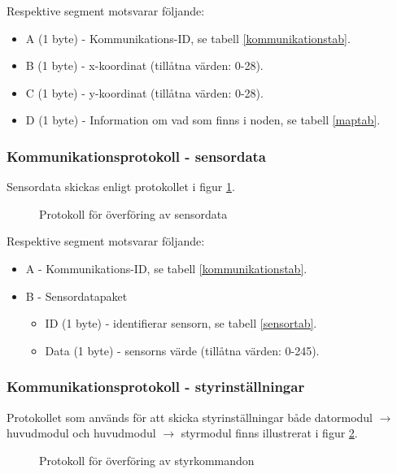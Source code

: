 \documentclass[11pt]{article}
\begin{document}
\begin{flushleft}
Respektive segment motsvarar följande: 
\begin{itemize}
	\item A (1 byte) - Kommunikations-ID, se tabell \ref{kommunikationstab}.
	\item B (1 byte) - x-koordinat (tillåtna värden: 0-28).
	\item C (1 byte) - y-koordinat (tillåtna värden: 0-28).
	\item D (1 byte) - Information om vad som finns i noden, se tabell \ref{maptab}.
\end{itemize}

\subsubsection{Kommunikationsprotokoll - sensordata}
Sensordata skickas enligt protokollet i figur \ref{sensordata}.

 \begin{figure}[H]
\centering
\noindent\resizebox{.8\linewidth}{!}{
	}
	\caption{Protokoll för överföring av sensordata\label{sensordata}}	
\end{figure} 

Respektive segment motsvarar följande: 
\begin{itemize}
	\item A - Kommunikations-ID, se tabell \ref{kommunikationstab}.
	\item B - Sensordatapaket
	\begin{itemize}
	\item ID (1 byte) - identifierar sensorn, se tabell \ref{sensortab}.
	\item Data (1 byte) - sensorns värde (tillåtna värden: 0-245).
	\end{itemize}
\end{itemize}

\subsubsection{Kommunikationsprotokoll - styrinställningar}
Protokollet som används för att skicka styrinställningar både datormodul $\rightarrow$ huvudmodul och huvudmodul $\rightarrow$ styrmodul finns illustrerat i figur \ref{styrkomm}.

\begin{figure}[htbp]
\centering
\noindent\resizebox{.8\linewidth}{!}{
	}
	\caption{Protokoll för överföring av styrkommandon\label{styrkomm}}	
\end{figure}


\end{flushleft}
\end{document}
